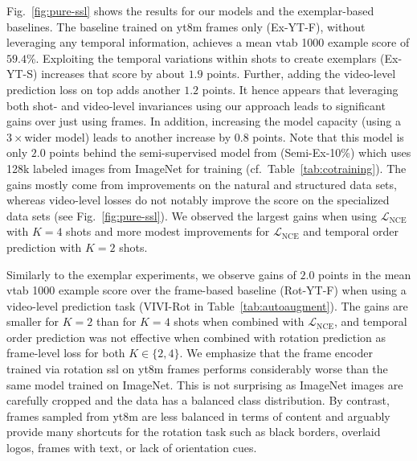 \documentclass[10pt,twocolumn,letterpaper]{article}
\newcommand{\Lnce}{\mathcal L_\text{NCE}}
\renewcommand{\paragraph}[1]{\noindent{\bf #1}\quad}
\begin{document}
\paragraph{Exemplar}
Fig.~\ref{fig:pure-ssl} shows the results for our models and the exemplar-based baselines. The baseline trained on \gls{yt8m} frames only (Ex-YT-F), without leveraging any temporal information, achieves a mean \gls{vtab} 1000 example score of $59.4$\%.
Exploiting the temporal variations within shots to create exemplars (Ex-YT-S) increases that score by about $1.9$ points. Further, adding the video-level prediction loss on top adds another $1.2$ points. It hence appears that leveraging both shot- and video-level invariances using our approach leads to significant gains over just using frames. In addition, increasing the model capacity (using a $3\times$wider model) leads to another increase by $0.8$ points. Note that this model is only $2.0$ points behind the semi-supervised model from \cite{zhai2019s4l} (Semi-Ex-10\%) which uses 128k labeled images from ImageNet for training (cf.\ Table~\ref{tab:cotraining}). The gains mostly come from improvements on the natural and structured data sets, whereas video-level losses do not notably improve the score on the specialized data sets (see Fig.\ \ref{fig:pure-ssl}). We observed the largest gains when using $\Lnce$ with $K=4$ shots and more modest improvements for $\Lnce$ and temporal order prediction with $K=2$ shots.

\vspace{1mm}
\paragraph{Rotation}
Similarly to the exemplar experiments, we observe gains of $2.0$ points in the mean \gls{vtab} 1000 example score over the frame-based baseline (Rot-YT-F) when using a video-level prediction task (VIVI-Rot in Table~\ref{tab:autoaugment}). The gains are smaller for $K=2$ than for $K=4$ shots when combined with $\Lnce$, and temporal order prediction was not effective when combined with rotation prediction as frame-level loss for both $K\in\{2,4\}$. We emphasize that the frame encoder trained via rotation \gls{ssl} on \gls{yt8m} frames performs considerably worse than the same model trained on ImageNet. This is not surprising as ImageNet images are carefully cropped and the data has a balanced class distribution. By contrast, frames sampled from \gls{yt8m} are less balanced in terms of content and arguably provide many shortcuts for the rotation task such as black borders, overlaid logos, frames with text, or lack of orientation cues.
\end{document}
